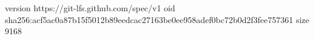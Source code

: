 version https://git-lfs.github.com/spec/v1
oid sha256:acf5ac0a87b15f5012b89eedcac27163be0ee958adef0bc72b0d2f3fee757361
size 9168
